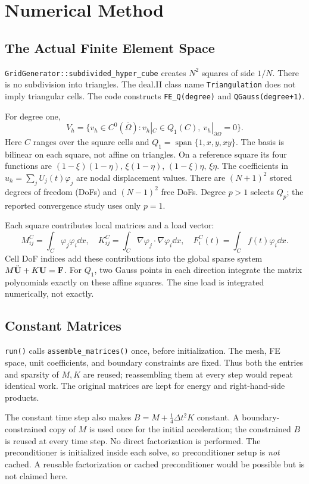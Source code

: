 \chapter{Numerical Method}

\section{The Actual Finite Element Space}
\texttt{GridGenerator::subdivided\_hyper\_cube} creates \(N^2\) squares of side
\(1/N\). There is no subdivision into triangles. The deal.II class name
\texttt{Triangulation} does not imply triangular cells.
The code constructs \texttt{FE\_Q(degree)} and \texttt{QGauss(degree+1)}.

For degree one,
\[
 V_h=\{v_h\in C^0(\overline\Omega):v_h|_C\in Q_1(C),\
       v_h|_{\partial\Omega}=0\}.
\]
Here \(C\) ranges over the square cells and
\(Q_1=\operatorname{span}\{1,x,y,xy\}\).
The basis is bilinear on each square, not affine on triangles.
On a reference square its four functions are
\((1-\xi)(1-\eta),\,\xi(1-\eta),\,(1-\xi)\eta,\,\xi\eta\).
The coefficients in \(u_h=\sum_j U_j(t)\varphi_j\) are nodal displacement
values. There are \((N+1)^2\) stored degrees of freedom (DoFs) and
\((N-1)^2\) free DoFs.
Degree \(p>1\) selects \(Q_p\); the reported convergence study uses only \(p=1\).

Each square contributes local matrices and a load vector:
\[
 M^C_{ij}=\int_C\varphi_j\varphi_i\dd x,\quad
 K^C_{ij}=\int_C\nabla\varphi_j\cdot\nabla\varphi_i\dd x,\quad
 F^C_i(t)=\int_C f(t)\varphi_i\dd x.
\]
Cell DoF indices add these contributions into the global sparse system
\(M\ddot{\mathbf{U}}+K\mathbf{U}=\mathbf{F}\).
For \(Q_1\), two Gauss points in each direction integrate the matrix
polynomials exactly on these affine squares. The sine load is integrated
numerically, not exactly.

\section{Constant Matrices}
\texttt{run()} calls \texttt{assemble\_matrices()} once, before initialization.
The mesh, FE space, unit coefficients, and boundary constraints are fixed.
Thus both the entries and sparsity of \(M,K\) are reused; reassembling them at
every step would repeat identical work. The original matrices are kept for
energy and right-hand-side products.

The constant time step also makes \(B=M+\frac14\Delta t^2K\) constant.
A boundary-constrained copy of \(M\) is used once for the initial acceleration;
the constrained \(B\) is reused at every time step.
No direct factorization is performed. The preconditioner is initialized
inside each solve, so preconditioner setup is \emph{not} cached.
A reusable factorization or cached preconditioner would be possible but is
not claimed here.

